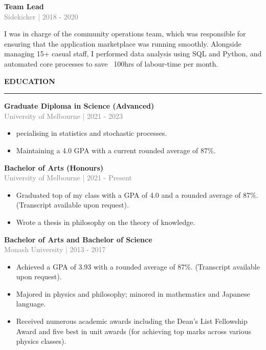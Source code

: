 \documentclass[10pt]{article}
\begin{document}
\vspace{0.5cm}
{\bf Team Lead} \\
\textcolor{gray}{Sidekicker | 2018 - 2020} \\[3pt]
\begin{small}
 I was in charge of the community operations team,  which was responsible for ensuring that the application marketplace was running smoothly. 
 Alongside managing 15+ casual staff, I performed data analysis using SQL and Python, and automated core processes to save ~100hrs of labour-time per month.
\end{small}


\vspace{1cm}
\begin{large}
{\bf EDUCATION} \\
\textcolor{gray}{\rule{2cm}{2mm}}
\end{large}
\vspace{5pt}

{\bf Graduate Diploma in Science (Advanced)} \\
\textcolor{gray}{University of Melbourne | 2021 - 2023}
\begin{small}
\begin{itemize}
  \item pecialising in statistics and stochastic processes.
  \item Maintaining a 4.0 GPA with a current rounded average of 87\%.
\end{itemize}
\end{small}

\vspace{0.5cm}
{\bf Bachelor of Arts (Honours)} \\
\textcolor{gray}{University of Melbourne | 2021 - Present}
\begin{small}
\begin{itemize}
  \item Graduated top of my class with a GPA of 4.0 and a rounded average of 87\%. (Transcript available upon request).
  \item Wrote a thesis in philosophy on the theory of knowledge.
\end{itemize}
\end{small}

\vspace{0.5cm}
{\bf Bachelor of Arts and Bachelor of Science} \\
\textcolor{gray}{Monash University | 2013 - 2017}
\begin{small}
\begin{itemize}
  \item Achieved a GPA of 3.93 with a rounded average of 87\%. (Transcript available upon request).
  \item Majored in physics and philosophy; minored in mathematics and Japanese language.
  \item Received numerous academic awards including the Dean's List Fellowship Award and five best in unit awards (for achieving top marks across various physics classes).
\end{itemize}
\end{small}
\end{document}
